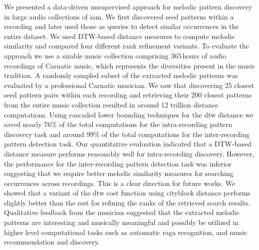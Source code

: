 We presented a data-driven unsupervised approach for melodic pattern discovery in large audio collections of \gls{iam}. We first discovered seed patterns within a recording and later used those as queries to detect similar occurrences in the entire dataset. We used DTW-based distance measures to compute melodic similarity and compared four different rank refinement variants. To evaluate the approach we use a sizable music collection comprising 365\,hours of audio recordings of Carnatic music, which represents the diversities present in the music tradition. A randomly sampled subset of the extracted melodic patterns was evaluated by a professional Carnatic musician. We saw that discovering 25 closest seed pattern pairs within each recording and retrieving their 200 closest patterns from the entire music collection resulted in around 12 trillion distance computations. Using cascaded lower bounding techniques for the \gls{dtw} distance we saved nearly 76\% of the total computations for the intra-recording pattern discovery task and around 99\% of the total computations for the inter-recording pattern detection task. Our quantitative evaluation indicated that a DTW-based distance measure performs reasonably well for intra-recording discovery. However, the performance for the inter-recording pattern detection task was inferior suggesting that we require better melodic similarity measures for searching occurrences across recordings. This is a clear direction for future works. We showed that a variant of the \gls{dtw} cost function using cityblock distance performs slightly better than the rest for refining the ranks of the retrieved search results. Qualitative feedback from the musician suggested that the extracted melodic patterns are interesting and musically meaningful and possibly be utilized in higher level computational tasks such as automatic \gls{raga} recognition, and music recommendation and discovery. 







